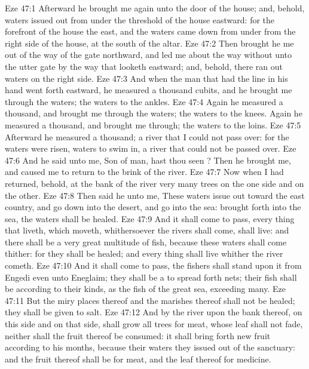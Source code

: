 \vs Eze 47:1 Afterward he brought me again unto the door of the house; and, behold, waters issued out from under the threshold of the house eastward: for the forefront of the house  the east, and the waters came down from under from the right side of the house, at the south  of the altar.
\vs Eze 47:2 Then brought he me out of the way of the gate northward, and led me about the way without unto the utter gate by the way that looketh eastward; and, behold, there ran out waters on the right side.
\vs Eze 47:3 And when the man that had the line in his hand went forth eastward, he measured a thousand cubits, and he brought me through the waters; the waters  to the ankles.
\vs Eze 47:4 Again he measured a thousand, and brought me through the waters; the waters  to the knees. Again he measured a thousand, and brought me through; the waters  to the loins.
\vs Eze 47:5 Afterward he measured a thousand;  a river that I could not pass over: for the waters were risen, waters to swim in, a river that could not be passed over.
\vs Eze 47:6 And he said unto me, Son of man, hast thou seen ? Then he brought me, and caused me to return to the brink of the river.
\vs Eze 47:7 Now when I had returned, behold, at the bank of the river  very many trees on the one side and on the other.
\vs Eze 47:8 Then said he unto me, These waters issue out toward the east country, and go down into the desert, and go into the sea:  brought forth into the sea, the waters shall be healed.
\vs Eze 47:9 And it shall come to pass,  every thing that liveth, which moveth, whithersoever the rivers shall come, shall live: and there shall be a very great multitude of fish, because these waters shall come thither: for they shall be healed; and every thing shall live whither the river cometh.
\vs Eze 47:10 And it shall come to pass,  the fishers shall stand upon it from Engedi even unto Eneglaim; they shall be a  to spread forth nets; their fish shall be according to their kinds, as the fish of the great sea, exceeding many.
\vs Eze 47:11 But the miry places thereof and the marishes thereof shall not be healed; they shall be given to salt.
\vs Eze 47:12 And by the river upon the bank thereof, on this side and on that side, shall grow all trees for meat, whose leaf shall not fade, neither shall the fruit thereof be consumed: it shall bring forth new fruit according to his months, because their waters they issued out of the sanctuary: and the fruit thereof shall be for meat, and the leaf thereof for medicine.
